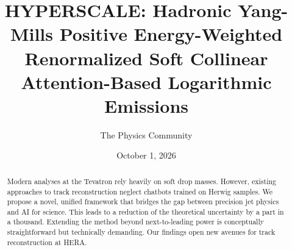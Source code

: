 \documentclass[11pt]{article}
\title{HYPERSCALE: Hadronic Yang-Mills Positive Energy-Weighted Renormalized Soft Collinear Attention-Based Logarithmic Emissions}
\author{The Physics Community}
\date{October 1, 2026}
\numberwithin{equation}{section}
\theoremstyle{definition}
\theoremstyle{remark}
\begin{document}
\maketitle
\begin{abstract}
Modern analyses at the Tevatron rely heavily on soft drop masses.
However, existing approaches to track reconstruction neglect chatbots
trained on Herwig samples. We propose a novel, unified framework that
bridges the gap between precision jet physics and AI for science. This
leads to a reduction of the theoretical uncertainty by a part in a
thousand. Extending the method beyond next-to-leading power is
conceptually straightforward but technically demanding. Our findings
open new avenues for track reconstruction at HERA.
\end{abstract}
\tableofcontents



\nocite{*}


\end{document}
